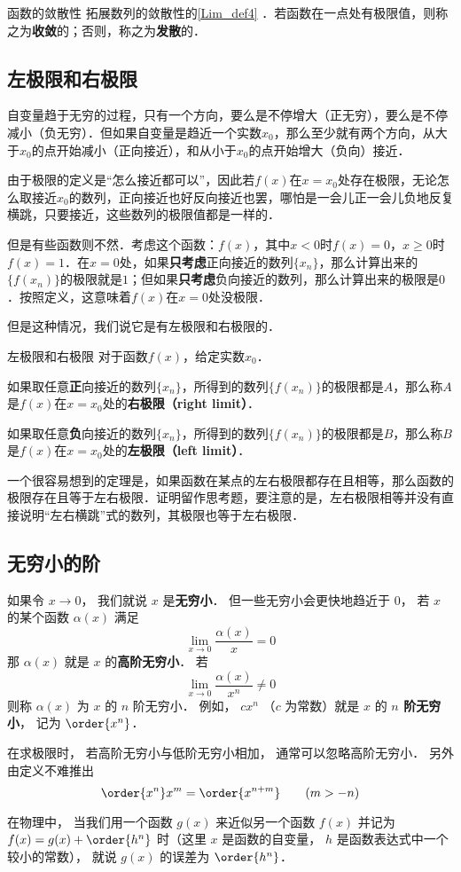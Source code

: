 \begin{definition}{函数的敛散性}
拓展数列的敛散性的\autoref{Lim_def4} ．若函数在一点处有极限值，则称之为\textbf{收敛}的；否则，称之为\textbf{发散}的．
\end{definition}

\subsection{左极限和右极限}

自变量趋于无穷的过程，只有一个方向，要么是不停增大（正无穷），要么是不停减小（负无穷）．但如果自变量是趋近一个实数$x_0$，那么至少就有两个方向，从大于$x_0$的点开始减小（正向接近），和从小于$x_0$的点开始增大（负向）接近．

由于极限的定义是“怎么接近都可以”，因此若$f(x)$在$x=x_0$处存在极限，无论怎么取接近$x_0$的数列，正向接近也好反向接近也罢，哪怕是一会儿正一会儿负地反复横跳，只要接近，这些数列的极限值都是一样的．

但是有些函数则不然．考虑这个函数：$f(x)$，其中$x<0$时$f(x)=0$，$x\geq 0$时$f(x)=1$．在$x=0$处，如果\textbf{只考虑}正向接近的数列$\{x_n\}$，那么计算出来的$\{f(x_n)\}$的极限就是$1$；但如果\textbf{只考虑}负向接近的数列，那么计算出来的极限是$0$．按照定义，这意味着$f(x)$在$x=0$处没极限．

但是这种情况，我们说它是有左极限和右极限的．

\begin{definition}{左极限和右极限}
对于函数$f(x)$，给定实数$x_0$．

如果取任意\textbf{正}向接近的数列$\{x_n\}$，所得到的数列$\{f(x_n)\}$的极限都是$A$，那么称$A$是$f(x)$在$x=x_0$处的\textbf{右极限（right limit）}．

如果取任意\textbf{负}向接近的数列$\{x_n\}$，所得到的数列$\{f(x_n)\}$的极限都是$B$，那么称$B$是$f(x)$在$x=x_0$处的\textbf{左极限（left limit）}．
\end{definition}

一个很容易想到的定理是，如果函数在某点的左右极限都存在且相等，那么函数的极限存在且等于左右极限．证明留作思考题，要注意的是，左右极限相等并没有直接说明“左右横跳”式的数列，其极限也等于左右极限．





\subsection{无穷小的阶}
如果令 $x\to 0$， 我们就说 $x$ 是\textbf{无穷小}． 但一些无穷小会更快地趋近于 $0$， 若 $x$ 的某个函数 $\alpha(x)$ 满足
\begin{equation}
\lim_{x\to 0} \frac{\alpha(x)}{x} = 0
\end{equation}
那 $\alpha(x)$ 就是 $x$ 的\textbf{高阶无穷小}． 若
\begin{equation}
\lim_{x\to 0} \frac{\alpha(x)}{x^n} \ne 0
\end{equation}
则称 $\alpha(x)$ 为 $x$ 的 $n$ 阶无穷小． 例如， $c x^n$ （$c$ 为常数）就是 $x$ 的 \textbf{$n$ 阶无穷小}， 记为 $\order{x^n}$．

在求极限时， 若高阶无穷小与低阶无穷小相加， 通常可以忽略高阶无穷小． 另外由定义不难推出
\begin{equation}
\order{x^n} x^m = \order{x^{n + m}} \qquad (m > -n)
\end{equation}

在物理中， 当我们用一个函数 $g(x)$ 来近似另一个函数 $f(x)$ 并记为 $f(x) = g(x) + \order{h^n}$ 时（这里 $x$ 是函数的自变量， $h$ 是函数表达式中一个较小的常数）， 就说 $g(x)$ 的误差为 $\order{h^n}$．
